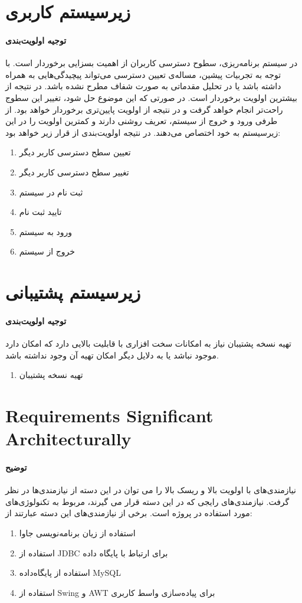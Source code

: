 \section{زیرسیستم کاربری}
\paragraph{توجیه اولویت‌بندی}
در سیستم برنامه‌ریزی، سطوح دسترسی کاربران از اهمیت بسزایی برخوردار است. با توجه به تجربیات پیشین، مساله‌ی تعیین دسترسی می‌تواند پیچیدگی‌هایی به همراه داشته باشد یا در تحلیل مقدماتی به صورت  شفاف مطرح نشده باشد. در نتیجه از بیشترین اولویت برخوردار است. در صورتی که این موضوع حل شود، تغییر این سطوج راحت‌تر انجام خواهد گرفت و در نتیجه از اولویت پایین‌تری برخوردار خواهد بود. از طرفی ورود و خروج از سیستم، تعریف روشنی دارند و کمترین اولویت را در این زیرسیستم به خود اختصاص می‌دهند. در نتیجه اولویت‌بندی از قرار زیر خواهد بود:
\begin{enumerate}
	\item تعیین سطح دسترسی کاربر دیگر
	\item تغییر سطح دسترسی کاربر دیگر
	\item ثبت نام در سیستم
	\item تایید ثبت نام
	\item ورود به سیستم
	\item خروج از سیستم			
\end{enumerate}

\section{زیرسیستم پشتیبانی}
\paragraph{توجیه اولویت‌بندی}
تهیه نسخه پشتیبان نیاز به امکانات سخت افزاری با قابلیت بالایی دارد که امکان دارد موجود نباشد یا به دلایل دیگر امکان تهیه آن وجود نداشته باشد.
\begin{enumerate}
	
	\item تهیه نسخه پشتیبان
\end{enumerate}

\newpage
\section{Requirements Significant Architecturally}
\paragraph{توضیح}
نیازمندی‌های با اولویت بالا و ریسک بالا را می توان در این دسته از نیازمندی‌ها در نظر گرفت. نیازمندی‌های رایجی که در این دسته قرار می گیرند، مربوط به تکنولوژی‌های مورد استفاده در پروژه است. برخی از نیازمندی‌های این دسته عبارتند از:
\begin{enumerate}
	\item استفاده از زیان برنامه‌نویسی جاوا
	\item استفاده از JDBC برای ارتباط با پایگاه داده
	\item استفاده از پایگاه‌داده MySQL
	\item استفاده از Swing و AWT برای پیاده‌سازی واسط کاربری
\end{enumerate}

